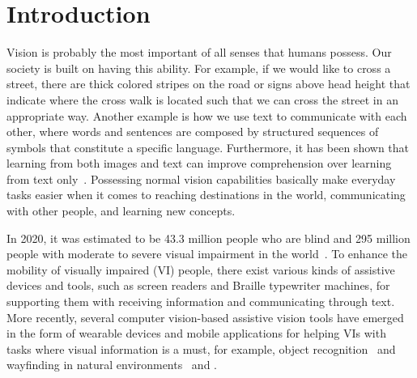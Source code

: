 
\chapter{Introduction}
\label{chap:introduction}

Vision is probably the most important of all senses that humans possess. Our society is built on having this ability. For example, if we would like to cross a street, there are thick colored stripes on the road or signs above head height that indicate where the cross walk is located such that we can cross the street in an appropriate way. Another example is how we use text to communicate with each other, where words and sentences are composed by structured sequences of symbols that constitute a specific language. 
Furthermore, it has been shown that learning from both images and text can improve comprehension over learning from text only~\cite{eitel2013picture, hibbing2003picture}. 
Possessing normal vision capabilities basically make everyday tasks easier when it comes to reaching destinations in the world, communicating with other people, and learning new concepts.  

In 2020, it was estimated to be 43.3 million people who are blind and 295 million people with moderate to severe visual impairment in the world~\cite{bourne2021trends}. To enhance the mobility of visually impaired (VI) people, there exist various kinds of assistive devices and tools, such as screen readers and Braille typewriter machines, for supporting them with receiving information and communicating through text. More recently, several computer vision-based assistive vision tools have emerged in the form of wearable devices and mobile applications for helping VIs with tasks where visual information is a must, for example, object recognition~\cite{ahmetovic2020recog, jafri2014computer, kacorri2017teachable} and wayfinding in natural environments~\cite{coughlan2009functional, kacorri2018environmental, loomis2020assisting} and . 

